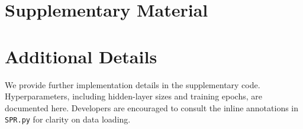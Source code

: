 \documentclass{article} %
\theoremstyle{plain}
\theoremstyle{definition}
\theoremstyle{remark}
\begin{document}



\appendix

\section*{\LARGE Supplementary Material}
\label{sec:appendix}

\section{Additional Details}
We provide further implementation details in the supplementary code. Hyperparameters, including hidden-layer sizes and training epochs, are documented here. Developers are encouraged to consult the inline annotations in \texttt{SPR.py} for clarity on data loading.
\end{document}
